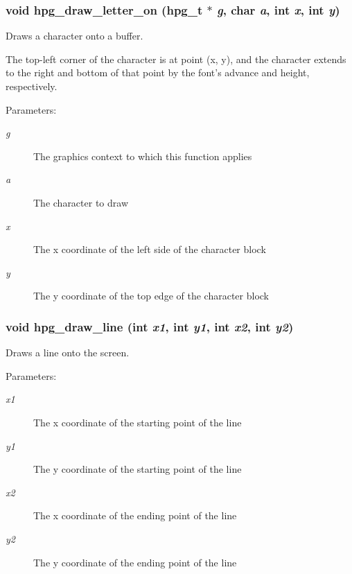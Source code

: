 \subsubsection{\setlength{\rightskip}{0pt plus 5cm}void hpg\_\-draw\_\-letter\_\-on ({\bf hpg\_\-t} $\ast$ {\em g}, char {\em a}, int {\em x}, int {\em y})}\label{hpgraphics_8h_a58}


Draws a character onto a buffer.

The top-left corner of the character is at point (x, y), and the character extends to the right and bottom of that point by the font's advance and height, respectively.\begin{Desc}
\item[Parameters: ]\par
\begin{description}
\item[{\em 
g}]The graphics context to which this function applies \item[{\em 
a}]The character to draw \item[{\em 
x}]The x coordinate of the left side of the character block \item[{\em 
y}]The y coordinate of the top edge of the character block \end{description}
\end{Desc}
\subsubsection{\setlength{\rightskip}{0pt plus 5cm}void hpg\_\-draw\_\-line (int {\em x1}, int {\em y1}, int {\em x2}, int {\em y2})}\label{hpgraphics_8h_a43}


Draws a line onto the screen.

\begin{Desc}
\item[Parameters: ]\par
\begin{description}
\item[{\em 
x1}]The x coordinate of the starting point of the line \item[{\em 
y1}]The y coordinate of the starting point of the line \item[{\em 
x2}]The x coordinate of the ending point of the line \item[{\em 
y2}]The y coordinate of the ending point of the line \end{description}
\end{Desc}
